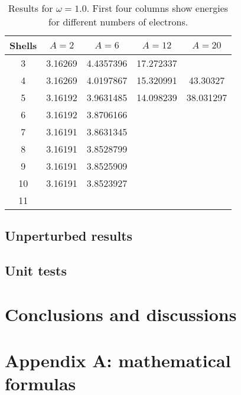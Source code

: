 \documentclass[11pt]{article}
\begin{document}
\begin{table}[H]
	\centering
	\begin{tabular}{c | c | c | c | c }

		Shells 	& $A = 2$	& $A = 6$ 	& $A = 12$ 	& $A = 20$ 	\\ \hline
		3		&3.16269	& 4.4357396	& 17.272337	& 			\\
		4		&3.16269	& 4.0197867	& 15.320991	& 43.30327	\\
		5		&3.16192	& 3.9631485	& 14.098239	& 38.031297	\\
		6		&3.16192	& 3.8706166	& 			& 			\\
		7		&3.16191	& 3.8631345	& 			& 			\\
		8		&3.16191	& 3.8528799	& 			& 			\\
		9		&3.16191	& 3.8525909	& 			& 			\\
		10		&3.16191	& 3.8523927	& 			& 			\\
		11		&			& 			& 			& 			\\

	\end{tabular}
	\caption{Results for $\omega = 1.0$. First four columns show energies for different numbers of electrons.}
\end{table}

\subsection{Unperturbed results}
\subsection{Unit tests}

\section{Conclusions and discussions}

\section{Appendix A: mathematical formulas}
\end{document}
